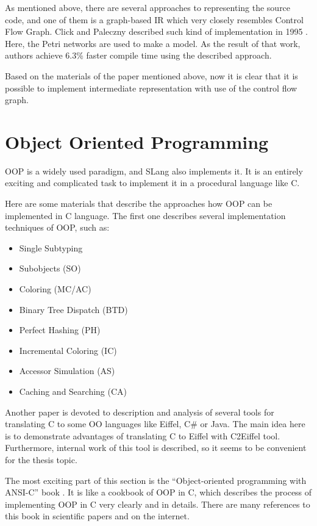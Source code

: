 As mentioned above, there are several approaches to representing the source code, and one of them is a   graph-based IR which very closely resembles Control Flow Graph. Click and Paleczny described such kind of implementation in 1995 \cite{Click1995}. Here, the Petri networks are used to make a model. As the result of that work, authors achieve 6.3\% faster compile time using the described approach.

Based on the materials of the paper mentioned above, now it is clear that it is possible to implement intermediate representation with use of the control flow graph.

\section{Object Oriented Programming}

OOP is a widely used paradigm, and SLang also implements it. 
It is an entirely exciting and complicated task to implement it in a procedural language like C.

Here are some materials that describe the approaches how OOP can be implemented in C language. The first one \cite{Ducournau2009} describes several implementation techniques of OOP, such as:

\begin{itemize}
\item Single   Subtyping
\item Subobjects   (SO)
\item Coloring   (MC/AC)
\item Binary   Tree   Dispatch   (BTD)
\item Perfect   Hashing   (PH)
\item Incremental   Coloring   (IC)
\item Accessor   Simulation   (AS)
\item Caching   and   Searching   (CA)
\end{itemize}
Another paper \cite{Trudel2012a} is devoted to description and analysis of several tools for translating C to some OO languages like Eiffel, C\# or Java. The main idea here is to demonstrate advantages of translating C to Eiffel with C2Eiffel tool. Furthermore, internal work of this tool is described, so it seems to be convenient for the thesis topic.

The most exciting part of this section is the ``Object-oriented programming with ANSI-C'' book \cite{Schreiner2011}.
It is like a cookbook of OOP in C, which describes the process of implementing OOP in C very clearly and in details.
There are many references to this book in scientific papers and on the internet.

